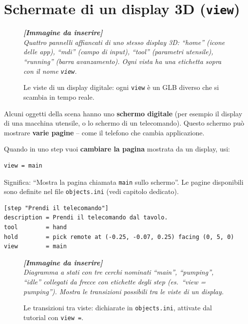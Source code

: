 ﻿\documentclass[a4paper,12pt,oneside]{book}
\newcommand{\file}[1]{\texttt{#1}}
\newcommand{\imgph}[2]{%
  \begin{tcolorbox}[colback=cvtlightblue!30,colframe=cvtblue!40,%
    width=#1,halign=center,valign=center,height=5cm,boxrule=0.5pt,arc=3pt]%
    \textcolor{cvtgray}{\itshape\footnotesize\textbf{[Immagine da inserire]}\\[3pt]#2}%
  \end{tcolorbox}}
\begin{document}
\chapter{Schermate di un display 3D (\texttt{view})}
\label{ch:view}

\begin{figure}[H]
  \centering
  \imgph{13cm}{Quattro pannelli affiancati di uno stesso display 3D: ``home'' (icone delle app), ``mdi'' (campo di input), ``tool'' (parametri utensile), ``running'' (barra avanzamento). Ogni vista ha una etichetta sopra con il nome \texttt{view}.}
  \caption{Le viste di un display digitale: ogni \texttt{view} è un GLB diverso che si scambia in tempo reale.}
  \label{fig:display-viste}
\end{figure}

Alcuni oggetti della scena hanno uno \textbf{schermo digitale} (per esempio il
display di una macchina utensile, o lo schermo di un telecomando). Questo
schermo può mostrare \textbf{varie pagine} -- come il telefono che cambia
applicazione.

Quando in uno step vuoi \textbf{cambiare la pagina} mostrata da un display,
usi:

\begin{lstlisting}
view = main
\end{lstlisting}

Significa: ``Mostra la pagina chiamata \texttt{main} sullo schermo''. Le pagine
disponibili sono definite nel file \file{objects.ini} (vedi capitolo dedicato).

\begin{esempiocvt}
\begin{lstlisting}
[step "Prendi il telecomando"]
description = Prendi il telecomando dal tavolo.
tool        = hand
hold        = pick remote at (-0.25, -0.07, 0.25) facing (0, 5, 0)
view        = main
\end{lstlisting}
\end{esempiocvt}

\begin{figure}[H]
  \centering
  \imgph{11cm}{Diagramma a stati con tre cerchi nominati ``main'', ``pumping'', ``idle'' collegati da frecce con etichette degli step (es.\ ``view = pumping''). Mostra le transizioni possibili tra le viste di un display.}
  \caption{Le transizioni tra viste: dichiarate in \file{objects.ini}, attivate dal tutorial con \texttt{view =}.}
  \label{fig:state-machine-viste}
\end{figure}
\end{document}
